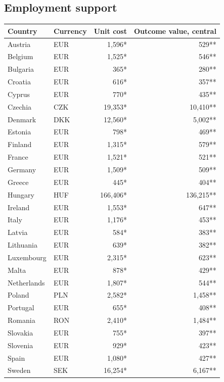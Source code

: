 \subsection*{Employment support}
\begin{longtable}{llrr}
\toprule
Country & Currency & Unit cost & Outcome value, central \\
\midrule
\endhead
Austria & EUR & 1,596* & 529** \\
Belgium & EUR & 1,525* & 546** \\
Bulgaria & EUR & 365* & 280** \\
Croatia & EUR & 616* & 357** \\
Cyprus & EUR & 770* & 435** \\
Czechia & CZK & 19,353* & 10,410** \\
Denmark & DKK & 12,560* & 5,002** \\
Estonia & EUR & 798* & 469** \\
Finland & EUR & 1,315* & 579** \\
France & EUR & 1,521* & 521** \\
Germany & EUR & 1,509* & 509** \\
Greece & EUR & 445* & 404** \\
Hungary & HUF & 166,406* & 136,215** \\
Ireland & EUR & 1,553* & 647** \\
Italy & EUR & 1,176* & 453** \\
Latvia & EUR & 584* & 383** \\
Lithuania & EUR & 639* & 382** \\
Luxembourg & EUR & 2,315* & 623** \\
Malta & EUR & 878* & 429** \\
Netherlands & EUR & 1,807* & 544** \\
Poland & PLN & 2,582* & 1,458** \\
Portugal & EUR & 655* & 408** \\
Romania & RON & 2,410* & 1,484** \\
Slovakia & EUR & 755* & 397** \\
Slovenia & EUR & 929* & 423** \\
Spain & EUR & 1,080* & 427** \\
Sweden & SEK & 16,254* & 6,167** \\
\bottomrule
\end{longtable}
